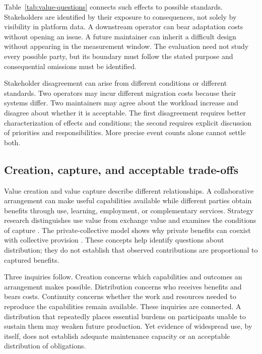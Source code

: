 Table~\ref{tab:value-questions} connects such effects to possible standards. Stakeholders are identified by their exposure to consequences, not solely by visibility in platform data. A downstream operator can bear adaptation costs without opening an issue. A future maintainer can inherit a difficult design without appearing in the measurement window. The evaluation need not study every possible party, but its boundary must follow the stated purpose and consequential omissions must be identified.



Stakeholder disagreement can arise from different conditions or different standards. Two operators may incur different migration costs because their systems differ. Two maintainers may agree about the workload increase and disagree about whether it is acceptable. The first disagreement requires better characterization of effects and conditions; the second requires explicit discussion of priorities and responsibilities. More precise event counts alone cannot settle both.

\subsection{Creation, capture, and acceptable trade-offs}
Value creation and value capture describe different relationships. A collaborative arrangement can make useful capabilities available while different parties obtain benefits through use, learning, employment, or complementary services. Strategy research distinguishes use value from exchange value and examines the conditions of capture \citep{bowman2000}. The private-collective model shows why private benefits can coexist with collective provision \citep{vonhippel2003}. These concepts help identify questions about distribution; they do not establish that observed contributions are proportional to captured benefits.

Three inquiries follow. Creation concerns which capabilities and outcomes an arrangement makes possible. Distribution concerns who receives benefits and bears costs. Continuity concerns whether the work and resources needed to reproduce the capabilities remain available. These inquiries are connected. A distribution that repeatedly places essential burdens on participants unable to sustain them may weaken future production. Yet evidence of widespread use, by itself, does not establish adequate maintenance capacity or an acceptable distribution of obligations.

